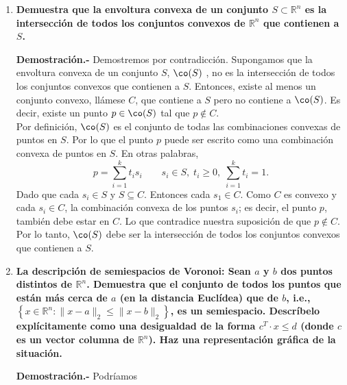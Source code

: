 \begin{enumerate}

    \item \textbf{\boldmath Demuestra que la envoltura convexa de un conjunto $S\subset \mathbb{R}^n$ es la intersección de todos los conjuntos convexos de $\mathbb{R}^n$ que contienen a $S$.}

	\textbf{Demostración.-}\; Demostremos por contradicción. Supongamos que la envoltura convexa de un conjunto $S$, $\co(S)$ , no es la intersección de todos los conjuntos convexos que contienen a $S$. Entonces, existe al menos un conjunto convexo, llámese $C$, que contiene a $S$ pero no contiene a $\co(S)$. Es decir, existe un punto $p\in \co(S)$ tal que $p\notin C$.\\
	Por definición, $\co(S)$ es el conjunto de todas las combinaciones convexas de puntos en $S$. Por lo que el punto $p$ puede ser escrito como una combinación convexa de puntos en $S$. En otras palabras,
	$$p=\sum_{i=1}^k t_is_i\qquad s_i\in S,\; t_i\geq 0,\; \sum_{i=1}^k t_i=1.$$
	Dado que cada $s_i\in S$ y $S\subseteq C$. Entonces cada $s_1\in C$. Como $C$ es convexo y cada $s_i\in C$, la combinación convexa de los puntos $s_i$; es decir, el punto $p$, también debe estar en $C$. Lo que contradice nuestra suposición de que $p\notin C$. Por lo tanto, $\co(S)$ debe ser la intersección de todos los conjuntos convexos que contienen a $S$.
	\vspace{.5cm}

    \item \textbf{\boldmath La descripción de semiespacios de Voronoi: Sean $a$ y $b$ dos puntos distintos de $\mathbb{R}^n$. Demuestra que el conjunto de todos los puntos que están más cerca de $a$ (en la distancia Euclídea) que de $b$, i.e., $\left\{x\in \mathbb{R}^n : \|x-a\|_2 \leq \|x-b\|_2\right\}$, es un semiespacio. Descríbelo explícitamente como una desigualdad de la forma $c^T\cdot x \leq d$ (donde $c$ es un vector columna de $\mathbb{R}^n$). Haz una representación gráfica de la situación.}

	\textbf{Demostración.-}\; Podríamos 
\end{enumerate}
